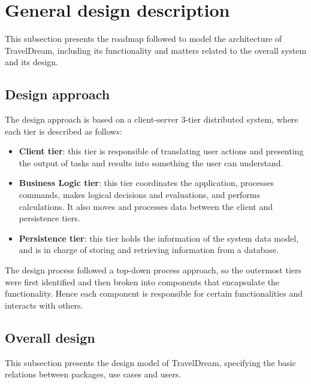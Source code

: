 \documentclass[a4paper,12pt]{book}
\begin{document}
\section{General design description}
This subsection presents the roadmap followed to model the architecture of TravelDream, including its functionality and matters related to the overall system and its design.

\subsection{Design approach}
The design approach is based on a client-server 3-tier distributed system, where each tier is described as follows:
\begin{itemize}
  \item \textbf{Client tier}: this tier is responsible of translating user actions and presenting the output of tasks and results into something the user can understand.
  \item \textbf{Business Logic tier}: this tier coordinates the application, processes commands, makes logical decisions and evaluations, and performs calculations. It also moves and processes data between the client and persistence tiers.
  \item \textbf{Persistence tier}: this tier holds the information of the system data model, and is in charge of storing and retrieving information from a database.
\end{itemize}

The design process followed a top-down process approach, so the outermost tiers were first identified and then broken into components that encapsulate the functionality. Hence each component is responsible for certain functionalities and interacts with others.

\subsection{Overall design}
This subsection presents the design model of TravelDream, specifying the basic relations between packages, use cases and users.
\end{document}
